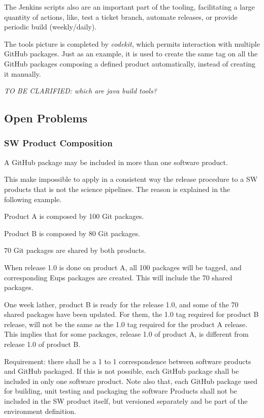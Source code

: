 The Jenkins scripts also are an important part of the tooling, facilitating a large quantity of actions, like, test a ticket branch, automate releases, or provide periodic build (weekly/daily).

The tools picture is completed by \textit{codekit}, which permits interaction with multiple GitHub packages.
Just as an example, it is used to create the same tag on all the GitHub packages composing a defined product automatically, instead of creating it manually.

\textit{TO BE CLARIFIED: which are java build tools?}


\subsection{Open Problems} \label{sec:openProblems}

\subsubsection{SW Product Composition} \label{sec:problemId}

A GitHub package may be included in more than one software product.

This make impossible to apply in a consistent way the release procedure to a SW products that is not the science pipelines.
The reason is explained in the following example.

Product A is composed by 100 Git packages.

Product B is composed by 80 Git packages.

70 Git packages are shared by both products.

When release 1.0 is done on product A, all 100 packages will be tagged, and corresponding Eups packages are created. This will include the 70 shared packages.

One week lather, product B is ready for the release 1.0, and some of the 70 shared packages have been updated.%
For them, the 1.0 tag required for product B release, will not be the same as the 1.0 tag required for the product A release.
This implies that for some packages, release 1.0 of product A, is different from release 1.0 of product B.

Requirement: there shall be a 1 to 1 correspondence between software products and GitHub packaged. If this is not possible, each GitHub package shall be included in only one software product.
Note also that, each GitHub package used for building, unit testing and packaging the software Products shall not be included in the SW product itself, but versioned separately and be part of the environment definition.


